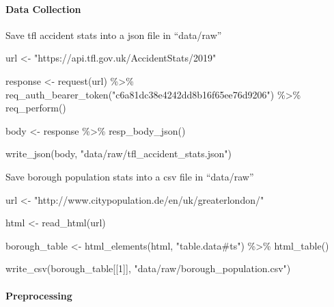 \documentclass[
]{article}
\newenvironment{Shaded}{\begin{snugshade}}{\end{snugshade}}
\newcommand{\DecValTok}[1]{\textcolor[rgb]{0.00,0.00,0.81}{#1}}
\newcommand{\FunctionTok}[1]{\textcolor[rgb]{0.00,0.00,0.00}{#1}}
\newcommand{\NormalTok}[1]{#1}
\newcommand{\OtherTok}[1]{\textcolor[rgb]{0.56,0.35,0.01}{#1}}
\newcommand{\SpecialCharTok}[1]{\textcolor[rgb]{0.00,0.00,0.00}{#1}}
\newcommand{\StringTok}[1]{\textcolor[rgb]{0.31,0.60,0.02}{#1}}
\begin{document}
\hypertarget{data-collection}{%
\paragraph{Data Collection}\label{data-collection}}

Save tfl accident stats into a json file in ``data/raw''

\begin{Shaded}
\begin{Highlighting}[]
\NormalTok{url }\OtherTok{\textless{}{-}} \StringTok{"https://api.tfl.gov.uk/AccidentStats/2019"}
  
\NormalTok{  response }\OtherTok{\textless{}{-}} \FunctionTok{request}\NormalTok{(url) }\SpecialCharTok{\%\textgreater{}\%} 
    \FunctionTok{req\_auth\_bearer\_token}\NormalTok{(}\StringTok{"c6a81dc38e4242dd8b16f65ee76d9206"}\NormalTok{) }\SpecialCharTok{\%\textgreater{}\%} 
    \FunctionTok{req\_perform}\NormalTok{()}
  
\NormalTok{  body }\OtherTok{\textless{}{-}}\NormalTok{ response }\SpecialCharTok{\%\textgreater{}\%} 
    \FunctionTok{resp\_body\_json}\NormalTok{()}
  
  \FunctionTok{write\_json}\NormalTok{(body, }\StringTok{"data/raw/tfl\_accident\_stats.json"}\NormalTok{)}
\end{Highlighting}
\end{Shaded}

Save borough population stats into a csv file in ``data/raw''

\begin{Shaded}
\begin{Highlighting}[]
\NormalTok{url }\OtherTok{\textless{}{-}} \StringTok{"http://www.citypopulation.de/en/uk/greaterlondon/"}
  
\NormalTok{  html }\OtherTok{\textless{}{-}} \FunctionTok{read\_html}\NormalTok{(url)}
  
\NormalTok{  borough\_table }\OtherTok{\textless{}{-}} \FunctionTok{html\_elements}\NormalTok{(html, }\StringTok{"table.data\#ts"}\NormalTok{) }\SpecialCharTok{\%\textgreater{}\%} 
    \FunctionTok{html\_table}\NormalTok{()}
  
  \FunctionTok{write\_csv}\NormalTok{(borough\_table[[}\DecValTok{1}\NormalTok{]], }\StringTok{"data/raw/borough\_population.csv"}\NormalTok{)}
\end{Highlighting}
\end{Shaded}

\hypertarget{preprocessing}{%
\paragraph{Preprocessing}\label{preprocessing}}
\end{document}
